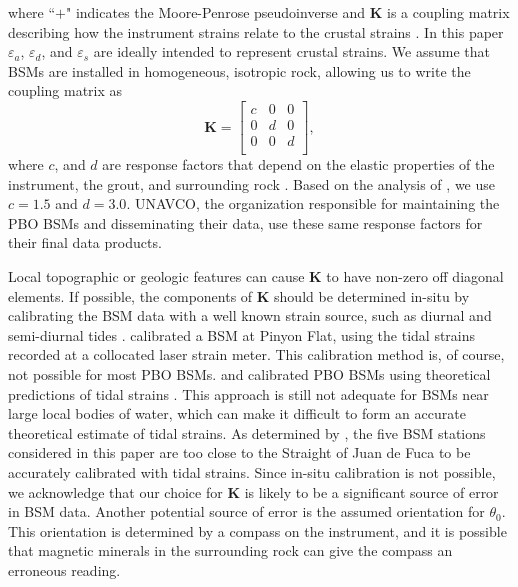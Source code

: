 \documentclass[10pt,a4paper]{article}
\begin{document}
where ``$+$" indicates the Moore-Penrose pseudoinverse and $\mathbf{K}$ is a coupling matrix describing how the instrument strains relate to the crustal strains \citep{Hart1996}. In this paper $\varepsilon_a$, $\varepsilon_d$, and $\varepsilon_s$ are ideally intended to represent crustal strains. We assume that BSMs are installed in homogeneous, isotropic rock, allowing us to write the coupling matrix as
\begin{equation}\label{eq:CouplingMatrix}
\mathbf{K} = 
\left[\begin{array}{ccc}
c & 0 & 0 \\
0 & d & 0 \\
0 & 0 & d \\
\end{array}\right],
\end{equation}  
where $c$, and $d$ are response factors that depend on the elastic properties of the instrument, the grout, and surrounding rock \citep{Gladwin1985}. Based on the analysis of \citet{Gladwin1985}, we use $c=1.5$ and $d=3.0$. UNAVCO, the organization responsible for maintaining the PBO BSMs and disseminating their data, use these same response factors for their final data products. 

Local topographic or geologic features can cause $\mathbf{K}$ to have non-zero off diagonal elements. If possible, the components of $\mathbf{K}$ should be determined in-situ by calibrating the BSM data with a well known strain source, such as diurnal and semi-diurnal tides \citep{Hart1996,Roeloffs2010,Hodgkinson2013}. \citet{Hart1996} calibrated a BSM at Pinyon Flat, using the tidal strains recorded at a collocated laser strain meter. This calibration method is, of course, not possible for most PBO BSMs. \citet{Roeloffs2010} and \citet{Hodgkinson2013} calibrated PBO BSMs using theoretical predictions of tidal strains \citep[e.g.,][]{Agnew1997}. This approach is still not adequate for BSMs near large local bodies of water, which can make it difficult to form an accurate theoretical estimate of tidal strains. As determined by \citet{Roeloffs2010}, the five BSM stations considered in this paper are too close to the Straight of Juan de Fuca to be accurately calibrated with tidal strains. Since in-situ calibration is not possible, we acknowledge that our choice for $\mathbf{K}$ is likely to be a significant source of error in BSM data. Another potential source of error is the assumed orientation for $\theta_0$. This orientation is determined by a compass on the instrument, and it is possible that magnetic minerals in the surrounding rock can give the compass an erroneous reading. 
\end{document}
